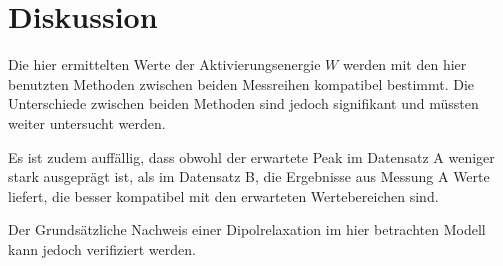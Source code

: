 \newpage
\section{Diskussion}
\label{sec:diskussion}
Die hier ermittelten Werte der Aktivierungsenergie $W$ werden mit den hier
benutzten Methoden zwischen beiden Messreihen kompatibel bestimmt. Die
Unterschiede zwischen beiden Methoden sind jedoch signifikant und müssten weiter
untersucht werden.

Es ist zudem auffällig, dass obwohl der erwartete Peak im Datensatz A weniger
stark ausgeprägt ist, als im Datensatz B, die Ergebnisse aus Messung A Werte
liefert, die besser kompatibel mit den erwarteten Wertebereichen sind.

Der Grundsätzliche Nachweis einer Dipolrelaxation im hier betrachten Modell
kann jedoch verifiziert werden.
